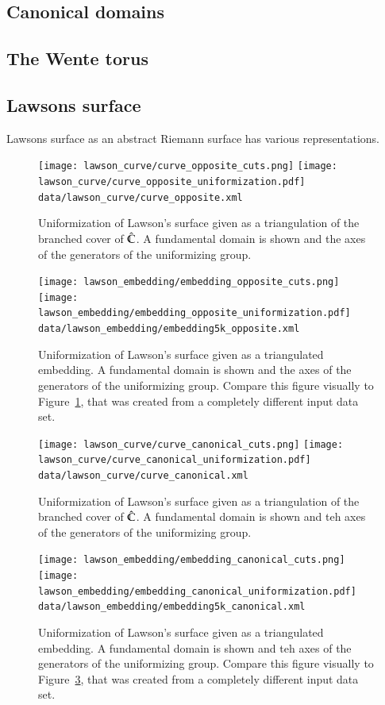 \documentclass[Thesis.tex]{subfiles}
\begin{document}
\subsection{Canonical domains}
\subsection{The Wente torus}
\subsection{Lawsons surface}

Lawsons surface as an abstract Riemann surface has various representations. 

\begin{figure}
\centering
\texttt{[image: lawson\_curve/curve\_opposite\_cuts.png]}
\texttt{[image: lawson\_curve/curve\_opposite\_uniformization.pdf]}
{\scriptsize\tt data/lawson\_curve/curve\_opposite.xml}
\caption{Uniformization of Lawson's surface given as a triangulation of the
branched cover of $\hat{\mathbb C}$. A fundamental domain is shown and the axes of the
generators of the uniformizing group.} 
\label{fig:lawson_curve_opposite}
\end{figure}


\begin{figure}
\centering
\texttt{[image: lawson\_embedding/embedding\_opposite\_cuts.png]}
\texttt{[image: lawson\_embedding/embedding\_opposite\_uniformization.pdf]}
{\scriptsize\tt data/lawson\_embedding/embedding5k\_opposite.xml}
\caption{Uniformization of Lawson's surface given as a triangulated embedding.
A fundamental domain is shown and the axes of the generators of the
uniformizing group. Compare this figure visually to
Figure~\ref{fig:lawson_curve_opposite}, that was created from a completely
different input data set.} 
\label{fig:lawson_embedding_opposite}
\end{figure}

\begin{figure}
\centering
\texttt{[image: lawson\_curve/curve\_canonical\_cuts.png]}
\texttt{[image: lawson\_curve/curve\_canonical\_uniformization.pdf]}
{\scriptsize\tt data/lawson\_curve/curve\_canonical.xml}
\caption{Uniformization of Lawson's surface given as a triangulation of the
branched cover of $\hat{\mathbb C}$. A fundamental domain is shown and teh axes of the
generators of the uniformizing group.} 
\label{fig:lawson_curve_canonical}
\end{figure}


\begin{figure} 
\centering
\texttt{[image: lawson\_embedding/embedding\_canonical\_cuts.png]}
\texttt{[image: lawson\_embedding/embedding\_canonical\_uniformization.pdf]}
{\scriptsize\tt data/lawson\_embedding/embedding5k\_canonical.xml}
\caption{Uniformization of Lawson's surface given as a triangulated embedding.
A fundamental domain is shown and teh axes of the generators of the
uniformizing group. Compare this figure visually to
Figure~\ref{fig:lawson_curve_canonical}, that was created from a completely
different input data set.} 
\label{fig:lawson_embedding_canonical}
\end{figure}
\end{document}
